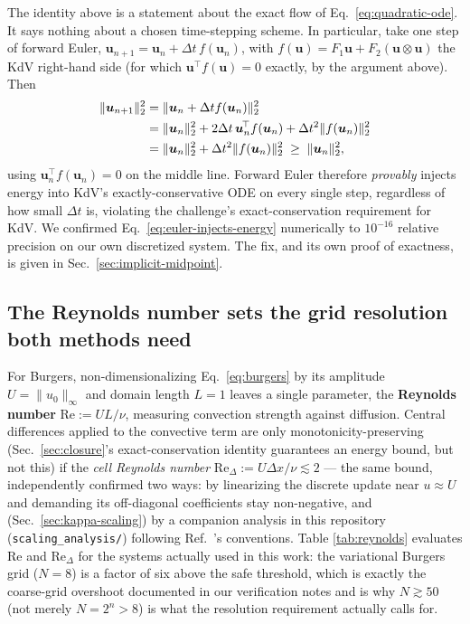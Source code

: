 \documentclass[aps,pra,twocolumn,notitlepage,superscriptaddress,floatfix,10pt]{revtex4-2}
\newcommand{\norm}[1]{\lVert #1 \rVert}
\begin{document}
The identity above is a statement about the exact flow of Eq.~\eqref{eq:quadratic-ode}. It says
nothing about a chosen time-stepping scheme. In particular, take one step of forward Euler,
$\bm u_{n+1}=\bm u_n+\Delta t\,f(\bm u_n)$, with $f(\bm u)=F_1\bm u+F_2(\bm u\otimes\bm u)$ the KdV
right-hand side (for which $\bm u^{\!\top}f(\bm u)=0$ exactly, by the argument above). Then
\begin{align}
\norm{\bm u_{n+1}}_2^2 &= \norm{\bm u_n+\Delta t f(\bm u_n)}_2^2\notag\\
&=\norm{\bm u_n}_2^2+2\Delta t\,\bm u_n^{\!\top}f(\bm u_n)+\Delta t^2\norm{f(\bm u_n)}_2^2\notag\\
&=\norm{\bm u_n}_2^2+\Delta t^2\norm{f(\bm u_n)}_2^2 \;\ge\;\norm{\bm u_n}_2^2,
\label{eq:euler-injects-energy}
\end{align}
using $\bm u_n^{\!\top}f(\bm u_n)=0$ on the middle line. Forward Euler therefore \emph{provably}
injects energy into KdV's exactly-conservative ODE on every single step, regardless of how small
$\Delta t$ is, violating the challenge's exact-conservation requirement for KdV. We confirmed
Eq.~\eqref{eq:euler-injects-energy} numerically to $10^{-16}$ relative precision on our own discretized
system. The fix, and its own proof of exactness, is given in Sec.~\ref{sec:implicit-midpoint}.

\subsection{The Reynolds number sets the grid resolution both methods need}
\label{sec:reynolds}
For Burgers, non-dimensionalizing Eq.~\eqref{eq:burgers} by its amplitude $U=\norm{u_0}_\infty$ and
domain length $L=1$ leaves a single parameter, the \textbf{Reynolds number}
$\mathrm{Re}:=UL/\nu$, measuring convection strength against diffusion. Central differences applied
to the convective term are only monotonicity-preserving (Sec.~\ref{sec:closure}'s exact-conservation
identity guarantees an energy bound, but not this) if the \emph{cell Reynolds number}
$\mathrm{Re}_\Delta:=U\Delta x/\nu\lesssim2$ --- the same bound, independently confirmed two ways: by
linearizing the discrete update near $u\approx U$ and demanding its off-diagonal coefficients stay
non-negative, and (Sec.~\ref{sec:kappa-scaling}) by a companion analysis in this repository
(\texttt{scaling\_analysis/}) following Ref.~\cite{Setty2026}'s conventions. Table
\ref{tab:reynolds} evaluates $\mathrm{Re}$ and $\mathrm{Re}_\Delta$ for the systems actually used in
this work: the variational Burgers grid ($N=8$) is a factor of six above the safe threshold, which is
exactly the coarse-grid overshoot documented in our verification notes and is why $N\gtrsim50$ (not
merely $N=2^n>8$) is what the resolution requirement actually calls for.
\end{document}
